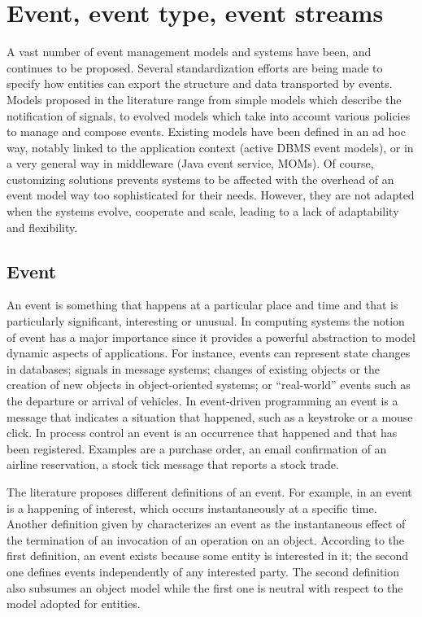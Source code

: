 \section{Event, event type, event streams}
\label{ch3:sec2}
A vast number of event management models and systems have been, and continues to be proposed. Several standardization efforts are being made to specify how entities can export the structure and data transported by events. Models proposed in the literature range from simple models which describe the notification of signals, to evolved models which take into account various policies to manage and compose events. 
Existing models have been defined in an ad hoc way, notably linked to the application context (active DBMS event models), or in a very general way in middleware (Java event service, MOMs). Of course, customizing solutions prevents systems to be affected with the overhead of an event model way too sophisticated for their needs. However, they are not adapted when the systems evolve, cooperate and scale, leading to a lack of adaptability and flexibility. 

 \subsection{Event}
 An event is something that happens at a particular place and time and that is particularly significant, interesting or unusual. In computing systems the notion of event has a major importance since it provides a powerful abstraction to model dynamic aspects of applications. For instance, events can represent state changes in databases; signals in message systems; changes of existing objects or the creation of new objects in object-oriented systems; or “real-world” events such as the departure or arrival of vehicles. In event-driven programming an event is a message that indicates a situation that happened, such as a keystroke or a mouse click. In process control an event is an occurrence that happened and that has been registered.  Examples are a purchase order, an email confirmation of an airline reservation, a stock tick message that reports a stock trade.
 
 The literature proposes different definitions of an event. For example, in \cite{Mansouri97gem} an event is a happening of interest, which occurs instantaneously at a specific time. Another definition given by \cite{Rosenblum97} characterizes an event as the instantaneous effect of the termination of an invocation of an operation on an object. According to the first definition, an event exists because some entity is interested in it; the second one defines events independently of any interested party. The second definition also subsumes an object model while the first one is neutral with respect to the model adopted for entities. 

